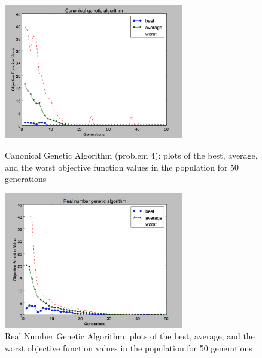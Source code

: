\documentclass{article}
\begin{document}
\begin{figure}
\includegraphics[width=0.7\textwidth]{Canonical_GA_best_plot}
\centering
\caption{Canonical Genetic Algorithm (problem 4): plots of the best, average, and the worst objective function values in the population for 50 generations}


\includegraphics[width=0.7\textwidth]{Real_number_GA}
\centering
\caption{Real Number Genetic Algorithm: plots of the best, average, and the worst objective function values in the population for 50 generations}



\end{figure}
\end{document}
